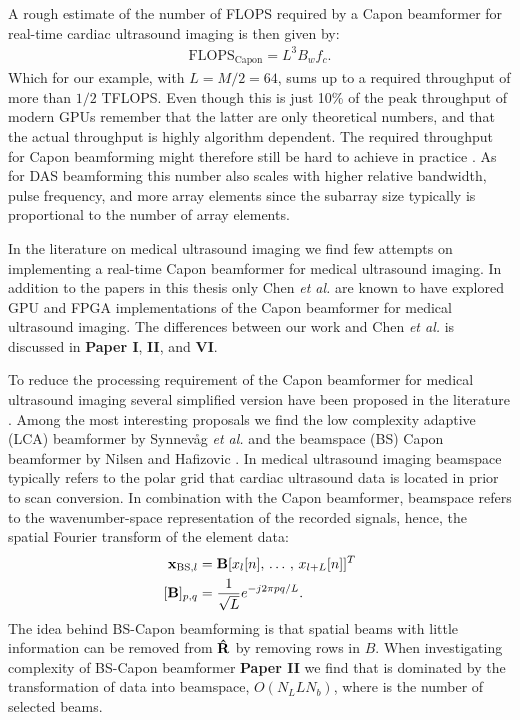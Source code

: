 A rough estimate of the number of FLOPS required by a Capon beamformer for real-time cardiac ultrasound imaging is then given by:
\begin{align}
\text{FLOPS}_{\text{Capon}} = L^3B_wf_c.
\end{align}
Which for our example, with $L=M/2=64$, sums up to a required throughput of more than $1/2$ TFLOPS. Even though this is just 10\% of the peak throughput of modern GPUs remember that the latter are only theoretical numbers, and that the actual throughput is highly algorithm dependent. The required throughput for Capon beamforming might therefore still be hard to achieve in practice \cite[\textbf{Paper II}]{So2011}. As for DAS beamforming this number also scales with higher relative bandwidth, pulse frequency, and more array elements since the subarray size typically is proportional to the number of array elements. 

In the literature on medical ultrasound imaging we find few attempts on implementing a real-time Capon beamformer for medical ultrasound imaging. In addition to the papers in this thesis only Chen \textit{et al.} \cite{Chen2011, Chen, Chen2011a} are known to have explored GPU and FPGA implementations of the Capon beamformer for medical ultrasound imaging. The differences between our work and Chen \textit{et al.} is discussed in \textbf{Paper I}, \textbf{II}, and \textbf{VI}.

To reduce the processing requirement of the Capon beamformer for medical ultrasound imaging several simplified version have been proposed in the literature \cite{Asl2012, Kim}. Among the most interesting proposals we find the low complexity adaptive (LCA) beamformer by Synnev\aa{}g \textit{et al.} \cite{Synnevag2011} and the beamspace (BS) Capon beamformer by Nilsen and Hafizovic \cite{Nilsen2009}. In medical ultrasound imaging beamspace typically refers to the polar grid that cardiac ultrasound data is located in prior to scan conversion. In combination with the Capon beamformer, beamspace refers to the wavenumber-space representation of the recorded signals, hence, the spatial Fourier transform of the element data: 
\begin{align}
\vec{x}_{\text{BS},l} &= \mat{B}[x_l[n],\,\dotso,\,x_{l+L}[n]]^T\\
[\mat{B}]_{p,q} &= \frac{1}{\sqrt{L}}e^{-j 2 \pi p q / L}.
\end{align}
The idea behind BS-Capon beamforming is that spatial beams with little information can be removed from $\mathbf{\hat{R}}$ by removing rows in $B$. When investigating complexity of BS-Capon beamformer \textbf{Paper II} we find that is dominated by the transformation of data into beamspace, $O(N_LLN_b)$, where  is the number of selected beams. 

